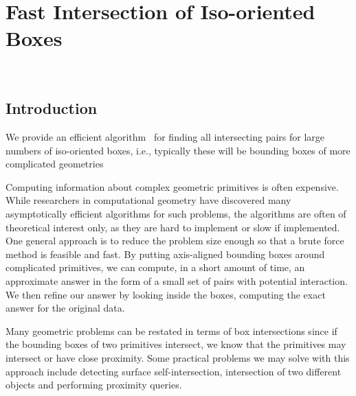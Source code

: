 
\ccParDims

\chapter{Fast Intersection of Iso-oriented Boxes}
\label{chapterBoxIntersection}
\\


\section{Introduction}

We provide an efficient algorithm~\cite{ze-fsbi-02} for finding all
intersecting pairs for large numbers of iso-oriented boxes, i.e.,
typically these will be bounding boxes of more complicated geometries

Computing information about complex geometric primitives is often
expensive. While researchers in computational geometry have discovered
many asymptotically efficient algorithms for such problems, the
algorithms are often of theoretical interest only, as they are hard to
implement or slow if implemented. One general approach is to reduce
the problem size enough so that a brute force method is feasible and
fast. By putting axis-aligned bounding boxes around complicated
primitives, we can compute, in a short amount of time, an approximate
answer in the form of a small set of pairs with potential interaction.
We then refine our answer by looking inside the boxes, computing the
exact answer for the original data.

Many geometric problems can be restated in terms of box intersections
since if the bounding boxes of two primitives intersect, we know that
the primitives may intersect or have close proximity. Some practical
problems we may solve with this approach include detecting surface
self-intersection, intersection of two different objects and
performing proximity queries.


